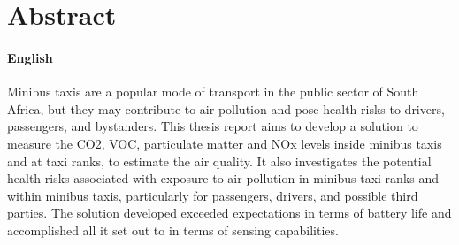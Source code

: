 \chapter*{Abstract}
\makeatletter{}\makeatother

\subsubsection*{English}

Minibus taxis are a popular mode of transport in the public sector of South Africa, but they may contribute to air pollution and pose health risks to drivers, passengers, and bystanders. This thesis report aims to develop a solution to measure the CO2, VOC, particulate matter and NOx levels inside minibus taxis and at taxi ranks, to estimate the air quality.
It also investigates the potential health risks associated with exposure to air pollution in minibus taxi ranks and within minibus taxis, particularly for passengers, drivers, and possible third parties.
The solution developed exceeded expectations in terms of battery life and accomplished all it set out to in terms of sensing capabilities.



